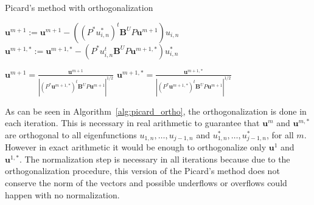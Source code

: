 \documentclass[smallextended]{svjour3}
\begin{document}
\begin{algorithm}[H] \caption{Picard's method with orthogonalization} \label{alg:picard_ortho} 
\begin{algorithmic}

    

\REPEAT



\STATE $\mathbf{u}^{m+1}:=\mathbf{u}^{m+1}-((P^*u_{i,n}^*)^t\mathbf{B}^U P\mathbf{u}^{m+1})u_{i,n}$
\STATE $\mathbf{u}^{m+1,*}:=\mathbf{u}^{m+1,*}-(P^*u_{i,n}^t\mathbf{B}^U P\mathbf{u}^{m+1,*})u_{i,n}^*$
\ENDFOR


\STATE $\displaystyle \mathbf{u}^{m+1}=\frac{\mathbf{u}^{m+1}}{|(P^*\mathbf{u}^{m+1,*})^t\mathbf{B}^U P\mathbf{u}^{m+1}|^{1/2}}$
\STATE $\displaystyle \mathbf{u}^{m+1,*}=\frac{\mathbf{u}^{m+1,*}}{|(P^*\mathbf{u}^{m+1,*})^t\mathbf{B}^U P\mathbf{u}^{m+1}|^{1/2}}$
\end{algorithmic}
\end{algorithm}

As can be seen in Algorithm~\ref{alg:picard_ortho}, the orthogonalization is done in each iteration. 
This is necessary in real arithmetic to guarantee that $\mathbf{u}^m$ and $\mathbf{u}^{m,*}$ are orthogonal to all 
eigenfunctions $u_{1,n},\dots,u_{j-1,n}$ and $u_{1,n}^*,\dots,u_{j-1,n}^*$, for all $m$. However in exact arithmetic it would 
be enough to orthogonalize only $\mathbf{u}^1$ and $\mathbf{u}^{1,*}$. The normalization step is necessary 
in all iterations because due to the orthogonalization procedure, this version of the Picard's 
method does not conserve the norm of the vectors and possible underflows or overflows could 
happen with no normalization.\\
\end{document}
